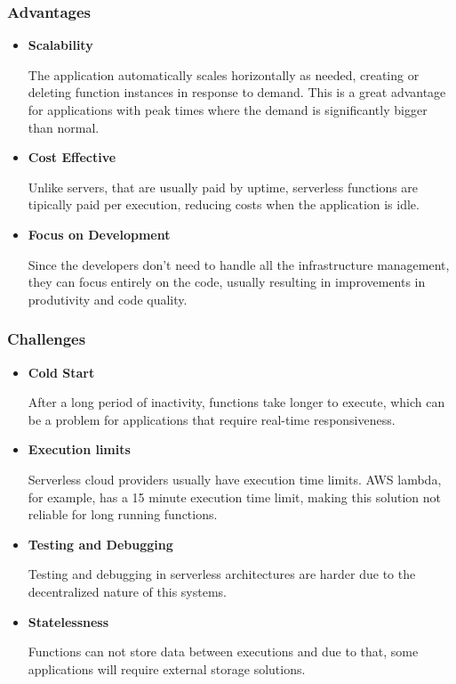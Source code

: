 \subsubsection{Advantages}
\begin{itemize}

	\item \textbf{Scalability}

	      The application automatically scales horizontally as needed, creating or
	      deleting function instances in response to demand. This is a great
	      advantage for applications with peak times where the demand is
	      significantly bigger than normal.

	\item \textbf{Cost Effective}

	      Unlike servers, that are usually paid by uptime, serverless functions are
	      tipically paid per execution, reducing costs when the application is idle.

	\item \textbf{Focus on Development}

	      Since the developers don't need to handle all the infrastructure management,
	      they can focus entirely on the code, usually resulting in improvements in
	      produtivity and code quality.


\end{itemize}

\subsubsection{Challenges}
\begin{itemize}
	\item \textbf{Cold Start}

	      After a long period of inactivity, functions take longer to execute, which
	      can be a problem for applications that require real-time responsiveness.

	\item \textbf{Execution limits}

	      Serverless cloud providers usually have execution time limits. \gls{AWS} lambda,
	      for example, has a 15 minute execution time limit, making this solution
	      not reliable for long running functions.

	\item \textbf{Testing and Debugging}

	      Testing and debugging in serverless architectures are harder due to the
	      decentralized nature of this systems.

	\item \textbf{Statelessness}

	      Functions can not store data between executions and due to that, some
	      applications will require external storage solutions.
\end{itemize}

